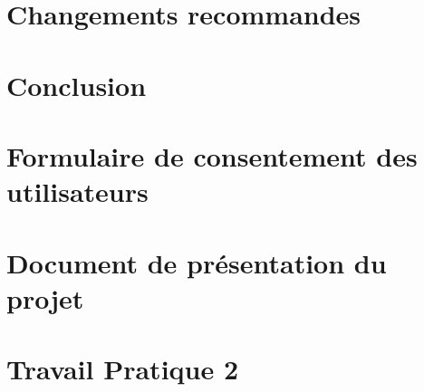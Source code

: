 \documentclass[letterpaper, oneside, 12pt, these, creativecommons]{thETS}
\begin{document}
\chapter{Changements recommandes}

\chapter{Conclusion}

\appendix
\multiannexe

\chapter{Formulaire de consentement des utilisateurs}



\chapter{Document de présentation du projet}



\chapter{Travail Pratique 2}


\end{document}
